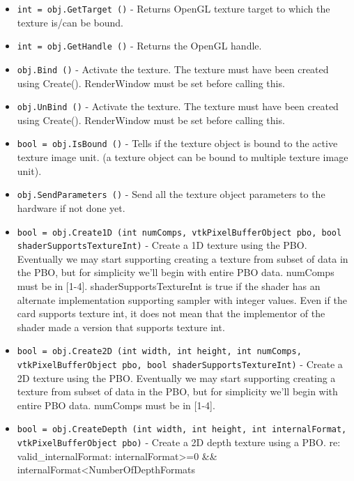\begin{itemize}
\item  \verb|int = obj.GetTarget ()| -  Returns OpenGL texture target to which the texture is/can be bound.

\item  \verb|int = obj.GetHandle ()| -  Returns the OpenGL handle.

\item  \verb|obj.Bind ()| -  Activate the texture. The texture must have been created using Create().
 RenderWindow must be set before calling this. 

\item  \verb|obj.UnBind ()| -  Activate the texture. The texture must have been created using Create().
 RenderWindow must be set before calling this. 

\item  \verb|bool = obj.IsBound ()| -  Tells if the texture object is bound to the active texture image unit.
 (a texture object can be bound to multiple texture image unit).

\item  \verb|obj.SendParameters ()| -  Send all the texture object parameters to the hardware if not done yet.
 

\item  \verb|bool = obj.Create1D (int numComps, vtkPixelBufferObject pbo, bool shaderSupportsTextureInt)| -  Create a 1D texture using the PBO.
 Eventually we may start supporting creating a texture from subset of data
 in the PBO, but for simplicity we'll begin with entire PBO data.
 numComps must be in [1-4].
 shaderSupportsTextureInt is true if the shader has an alternate
 implementation supporting sampler with integer values.
 Even if the card supports texture int, it does not mean that
 the implementor of the shader made a version that supports texture int.

\item  \verb|bool = obj.Create2D (int width, int height, int numComps, vtkPixelBufferObject pbo, bool shaderSupportsTextureInt)| -  Create a 2D texture using the PBO.
 Eventually we may start supporting creating a texture from subset of data
 in the PBO, but for simplicity we'll begin with entire PBO data.
 numComps must be in [1-4].

\item  \verb|bool = obj.CreateDepth (int width, int height, int internalFormat, vtkPixelBufferObject pbo)| -  Create a 2D depth texture using a PBO.
 re: valid\_internalFormat: internalFormat>=0 \&\& internalFormat<NumberOfDepthFormats


\end{itemize}
